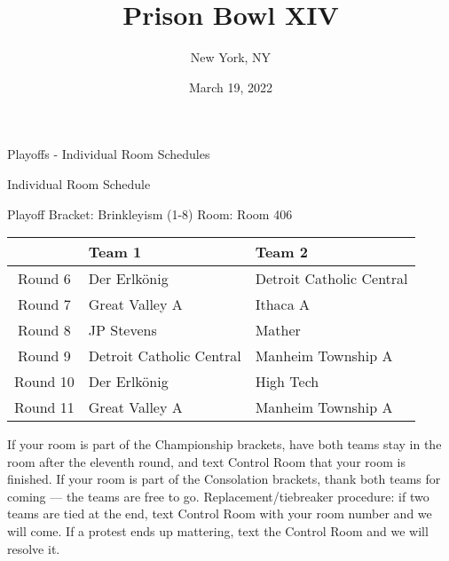 \documentclass{article}%
\title{Prison Bowl XIV}%
\author{New York, NY}%
\date{March 19, 2022}%
\begin{document}
%
\normalsize%
%
\maketitle%
\vspace*{48pt}%
\begin{center}%
\begin{Huge}%
Playoffs {-} Individual Room Schedules%
\end{Huge}%
\end{center}%
\newpage%
\pagestyle{fancy}%
\fancyhf{}%
%
%
%
\begin{center}%
\begin{Huge}%
Individual Room Schedule%
\end{Huge}%
\vspace*{16pt}%
\linebreak%
\begin{Large}%
Playoff Bracket: Brinkleyism (1-8) \hfill Room: Room 406%
\end{Large}%
\end{center}%
%
\begin{tabularx}{\textwidth}{|c|Y|Y|}%
\hline%
&Team 1&Team 2\\%
\hline%
Round 6&Der Erlkönig&Detroit Catholic Central\\%
Round 7&Great Valley A&Ithaca A\\%
Round 8&JP Stevens&Mather\\%
Round 9&Detroit Catholic Central&Manheim Township A\\%
Round 10&Der Erlkönig&High Tech\\%
Round 11&Great Valley A&Manheim Township A\\%
\hline%
\end{tabularx}%
\vspace*{16pt}%
\linebreak%
If your room is part of the Championship brackets, have both teams stay in the room after the eleventh round, and text Control Room that your room is finished.\newline%
\newline%
If your room is part of the Consolation brackets, thank both teams for coming — the teams are free to go.\newline%
\newline%
Replacement/tiebreaker procedure: if two teams are tied at the end, text Control Room with your room number and we will come. If a protest ends up mattering, text the Control Room and we will resolve it.\newline%
\end{document}
